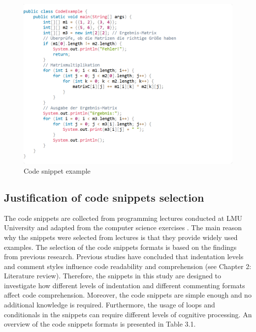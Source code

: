 \begin{figure} [H]
  \centering
  \includegraphics[scale=1]{figures/codeb.png}
  \caption{Code snippet example }
  \label{fig:AnhangsChor}
\end{figure}




\subsection{Justification of code snippets selection }
The code snippets are collected from programming lectures conducted at LMU University and adapted from the computer science exercises \cite{lmu_programming_lectures}. The main reason why the snippets were selected from lectures is that they provide widely used examples. 
The selection of the code snippets formats is based on the findings from previous research. Previous studies have concluded that indentation levels and comment styles influence code readability and comprehension  (see Chapter 2: Literature review). Therefore, the snippets in this study are designed to investigate how different levels of indentation and different commenting formats affect code comprehension.  Moreover, the code snippets are simple enough and no additional knowledge is required. Furthermore, the usage of loops and conditionals in the snippets can require different levels of cognitive processing.  An overview of the code snippets formats is presented in Table 3.1.   

